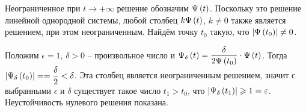 \documentclass[a5paper,10pt]{article}
\begin{document}
Неограниченное при $t \to +\infty$ решение обозначим $\Psi\left(t\right)$. Поскольку это решение линейной однородной системы, любой столбец $k \Psi\left(t\right)$, $k \ne 0$ также является решением, при этом неограниченным. Найдём точку $t_{0}$ такую, что $\left|\Psi\left(t_{0}\right)\right| \ne 0$.

Положим $\epsilon = 1$, $\delta > 0$ -- произвольное число и $\Psi_{\delta}\left(t\right) =  \dfrac {\delta} {2\Psi\left(t_{0}\right)} \cdot \Psi\left(t\right)$. Тогда $\vbr{\Psi_{\delta}\br{t_{0}}} = \linebreak = \dfrac {\delta}  {2} < \delta$. Эта столбец является неограниченным решением, значит с выбранными $\epsilon$ и $\delta$ существует такое число $t_{1} > t_{0}$, что $\left|\Psi_{\delta}\left(t_{1}\right)\right| \geqslant 1 = \varepsilon$. Неустойчивость нулевого решения показана.
\end{document}
